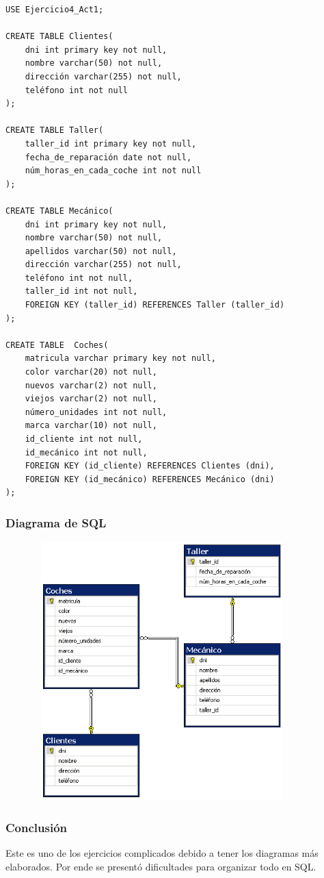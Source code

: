 \documentclass[a4paper, 12pt]{article}
\begin{document}
\begin{justify}
\begin{verbatim}
USE Ejercicio4_Act1;

CREATE TABLE Clientes(
    dni int primary key not null,
    nombre varchar(50) not null,
    dirección varchar(255) not null,
    teléfono int not null
);

CREATE TABLE Taller(
    taller_id int primary key not null,
    fecha_de_reparación date not null,
    núm_horas_en_cada_coche int not null
);

CREATE TABLE Mecánico(
    dni int primary key not null,
    nombre varchar(50) not null,
    apellidos varchar(50) not null,
    dirección varchar(255) not null,
    teléfono int not null,
    taller_id int not null,
    FOREIGN KEY (taller_id) REFERENCES Taller (taller_id)
);

CREATE TABLE  Coches(
    matricula varchar primary key not null,
    color varchar(20) not null,
    nuevos varchar(2) not null,
    viejos varchar(2) not null,
    número_unidades int not null,
    marca varchar(10) not null,
    id_cliente int not null,
    id_mecánico int not null,
    FOREIGN KEY (id_cliente) REFERENCES Clientes (dni),
    FOREIGN KEY (id_mecánico) REFERENCES Mecánico (dni)
);
\end{verbatim}
        \subsubsection{Diagrama de SQL}
        \begin{figure}[H]
            \centering
            \includegraphics[width=10cm,height=10cm]{sql4.png}
        \end{figure}
        \subsubsection{Conclusión}
        \justify
        Este es uno de los ejercicios complicados debido a tener los diagramas más elaborados. Por ende se presentó dificultades para organizar todo en SQL.

\end{justify}
\end{document}
